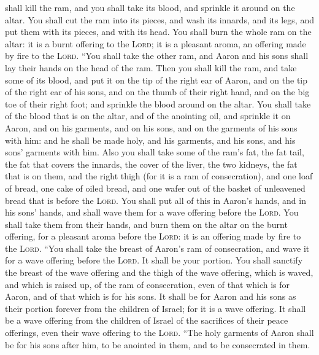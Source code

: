 shall kill the ram, and you shall take its blood, and sprinkle it around
on the altar.  You shall cut the ram into its pieces, and
wash its innards, and its legs, and put them with its pieces, and with
its head.  You shall burn the whole ram on the altar: it
is a burnt offering to the \textsc{Lord}; it is a pleasant aroma, an
offering made by fire to the \textsc{Lord}.  ``You shall
take the other ram, and Aaron and his sons shall lay their hands on the
head of the ram.  Then you shall kill the ram, and take
some of its blood, and put it on the tip of the right ear of Aaron, and
on the tip of the right ear of his sons, and on the thumb of their right
hand, and on the big toe of their right foot; and sprinkle the blood
around on the altar.  You shall take of the blood that is
on the altar, and of the anointing oil, and sprinkle it on Aaron, and on
his garments, and on his sons, and on the garments of his sons with him:
and he shall be made holy, and his garments, and his sons, and his sons'
garments with him.  Also you shall take some of the ram's
fat, the fat tail, the fat that covers the innards, the cover of the
liver, the two kidneys, the fat that is on them, and the right thigh
(for it is a ram of consecration),  and one loaf of
bread, one cake of oiled bread, and one wafer out of the basket of
unleavened bread that is before the \textsc{Lord}.  You
shall put all of this in Aaron's hands, and in his sons' hands, and
shall wave them for a wave offering before the \textsc{Lord}.
 You shall take them from their hands, and burn them on
the altar on the burnt offering, for a pleasant aroma before the
\textsc{Lord}: it is an offering made by fire to the \textsc{Lord}.
 ``You shall take the breast of Aaron's ram of
consecration, and wave it for a wave offering before the \textsc{Lord}.
It shall be your portion.  You shall sanctify the breast
of the wave offering and the thigh of the wave offering, which is waved,
and which is raised up, of the ram of consecration, even of that which
is for Aaron, and of that which is for his sons.  It
shall be for Aaron and his sons as their portion forever from the
children of Israel; for it is a wave offering. It shall be a wave
offering from the children of Israel of the sacrifices of their peace
offerings, even their wave offering to the \textsc{Lord}.
 ``The holy garments of Aaron shall be for his sons after
him, to be anointed in them, and to be consecrated in them.

